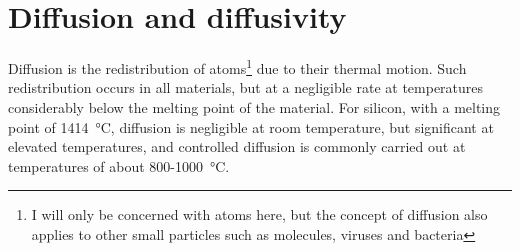 \documentclass[11pt,bibliography=totoc,index=totoc]{scrbook}   %
\begin{document}







%
\section{Diffusion and diffusivity}\label{sec:Diffusion}
%

Diffusion is the redistribution of atoms\footnote{I will only be concerned with atoms here, but the concept of diffusion also applies to other small particles such as molecules, viruses and bacteria} due to their thermal motion. 
Such redistribution occurs in all materials, but at a negligible rate at temperatures considerably below the melting point of the material.
For silicon, with a melting point of \SI{1414}{\celsius}, diffusion is negligible at room temperature, 
but significant at elevated temperatures, and controlled diffusion is commonly carried out at temperatures 
of about 800-\SI{1000}{\celsius}. 
\end{document}
